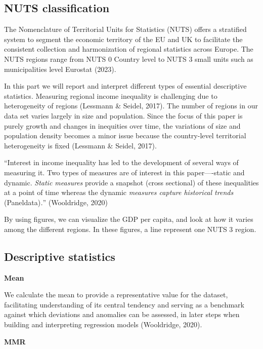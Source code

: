 \documentclass[
  a4paper,
  DIV=11,
  numbers=noendperiod]{scrartcl}
\begin{document}
\hypertarget{nuts-classification}{%
\subsection{NUTS classification}\label{nuts-classification}}

The Nomenclature of Territorial Units for Statistics (NUTS) offers a
stratified system to segment the economic territory of the EU and UK to
facilitate the consistent collection and harmonization of regional
statistics across Europe. The NUTS regions range from NUTS 0 Country
level to NUTS 3 small units such as municipalities level Eurostat
(2023). ~

In this part we will report and interpret different types of essential
descriptive statistics. Measuring regional income inequality is
challenging due to heterogeneity of regions (Lessmann \& Seidel, 2017).
The number of regions in our data set varies largely in size and
population. Since the focus of this paper is purely growth and changes
in inequities over time, the variations of size and population density
becomes a minor issue because the country-level territorial
heterogeneity is fixed (Lessmann \& Seidel, 2017).

``Interest in income inequality has led to the development of several
ways of measuring it. Two types of measures are of interest in this
paper----static and dynamic. \emph{Static measures} provide a snapshot
(cross sectional) of these inequalities at a point of time whereas the
dynamic \emph{measures capture historical trends} (Paneldata)\emph{.}''
(Wooldridge, 2020)

By using figures, we can visualize the GDP per capita, and look at how
it varies among the different regions. In these figures, a line
represent one NUTS 3 region.

\hypertarget{descriptive-statistics}{%
\subsection{Descriptive statistics}\label{descriptive-statistics}}

\textbf{Mean}

We calculate the mean to provide a representative value for the dataset,
facilitating understanding of its central tendency and serving as a
benchmark against which deviations and anomalies can be assessed, in
later steps when building and interpreting regression models
(Wooldridge, 2020).

\textbf{MMR}
\end{document}
